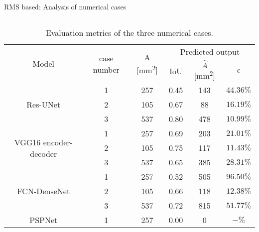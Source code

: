 \documentclass[10pt,aspectratio=169,dvipsnames]{beamer} %
\begin{document}
	\begin{frame}{RMS based: Analysis of numerical cases}
		\begin{columns}[T]
							\tiny
							\begin{column}[c]{0.48\textwidth}
								\begin{table}[ht!]
									\centering
									\caption{Evaluation metrics of the three numerical cases.}
									\label{tab:RMS_num_cases}
									\begin{tabular}{cccccc}
										\toprule[1.5pt]
										\multirow{2}{*}{Model} & \multirow{2}{*}{case number} & \multicolumn{1}{c}{\multirow{2}{*}{A [mm\textsuperscript{2}]}} & \multicolumn{3}{c}{Predicted output} \\ 
										\cmidrule(lr){4-6} & & & \multicolumn{1}{c}{IoU} & \multicolumn{1}{c}{\(\hat{A}\) [mm\textsuperscript{2}]} & \(\epsilon\) \\
										\midrule
										\multirow{3}{*}{Res-UNet} 							
										& 1 & 257 & \multicolumn{1}{c}{0.45} & \multicolumn{1}{c}{143} & \(44.36\%\) \\ 
										& 2 & 105 & \multicolumn{1}{c}{0.67} & \multicolumn{1}{c}{88} & \(16.19\%\) \\ 
										& 3 & 537 & \multicolumn{1}{c}{0.80} & \multicolumn{1}{c}{478} & \(10.99\%\) \\ 
										\midrule
										\multirow{3}{*}{VGG16 encoder-decoder} 
										& 1 & 257 & \multicolumn{1}{c}{0.69} & \multicolumn{1}{c}{203} & \(21.01\%\) \\ 
										& 2 & 105 & \multicolumn{1}{c}{0.75} & \multicolumn{1}{c}{117} & \(11.43\%\) \\ 
										& 3 & 537 & \multicolumn{1}{c}{0.65} & \multicolumn{1}{c}{385} & \(28.31\%\) \\ 
										\midrule
										\multirow{3}{*}{FCN-DenseNet} 
										& 1 & 257 & \multicolumn{1}{c}{0.52} & \multicolumn{1}{c}{505} & \(96.50\%\) \\ 
										& 2 & 105 & \multicolumn{1}{c}{0.66} & \multicolumn{1}{c}{118} & \(12.38\%\) \\ 
										& 3 & 537 & \multicolumn{1}{c}{0.72} & \multicolumn{1}{c}{815} & \(51.77\%\) \\ 
										\midrule
										\multirow{3}{*}{PSPNet} 
										& 1 & 257 & \multicolumn{1}{c}{0.00} & \multicolumn{1}{c}{0} & \(-\%\) \\ 

\end{tabular}
\end{table}
\end{column}
\end{columns}
\end{frame}
\end{document}
